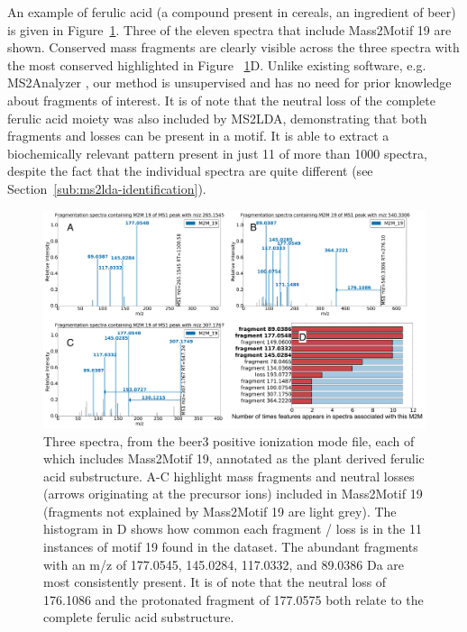 An example of ferulic acid (a compound present in cereals, an ingredient of beer) is given in Figure~\ref{fig:m2lda-ferulic-acid}. Three of the eleven spectra that include Mass2Motif 19 are shown. Conserved mass fragments are clearly visible across the three spectra with the most conserved highlighted in Figure ~\ref{fig:m2lda-ferulic-acid}D. Unlike existing software, e.g. MS2Analyzer \cite{ma2014ms2analyzer}, our method is unsupervised and has no need for prior knowledge about fragments of interest. It is of note that the neutral loss of the complete ferulic acid moiety was also included by MS2LDA, demonstrating that both fragments and losses can be present in a motif. It is able to extract a biochemically relevant pattern present in just 11 of more than 1000 spectra, despite the fact that the individual spectra are quite different (see Section~\ref{sub:ms2lda-identification}).   

\begin{figure}[!htbp]
\centering\includegraphics[width=1.0\linewidth]{07-lda/figures/ferulic_acid.pdf}
\centering\caption{Three spectra, from the beer3 positive ionization mode file, each of which includes Mass2Motif 19, annotated as the plant derived ferulic acid substructure. A-C highlight mass fragments and neutral losses (arrows originating at the precursor ions) included in Mass2Motif 19 (fragments not explained by Mass2Motif 19 are light grey). The histogram in D shows how common each fragment / loss is in the 11 instances of motif 19 found in the dataset. The abundant fragments with an m/z of 177.0545, 145.0284, 117.0332, and 89.0386 Da are most consistently present. It is of note that the neutral loss of 176.1086 and the protonated fragment of 177.0575 both relate to the complete ferulic acid substructure.\label{fig:m2lda-ferulic-acid}}
\end{figure}

